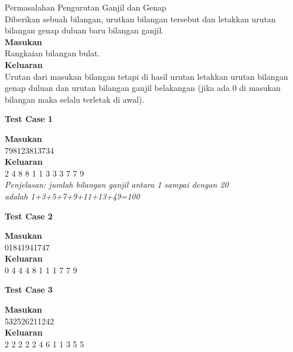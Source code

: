 \newpage
\begin{permasalahan}{Permasalahan Pengurutan Ganjil dan Genap}\\
	Diberikan sebuah bilangan, urutkan bilangan tersebut dan letakkan urutan bilangan genap duluan baru bilangan ganjil.\\
	\textbf{Masukan}\\
	Rangkaian bilangan bulat.\\
	\textbf{Keluaran}\\
	Urutan dari masukan bilangan tetapi di hasil urutan letakkan urutan bilangan genap duluan dan urutan bilangan ganjil belakangan (jika ada 0 di masukan bilangan maka selalu terletak di awal).\\
	\begin{center}
	\textbf{Test Case 1}\\
	\end{center}
	\textbf{Masukan}\\
	798123813734\\
	\textbf{Keluaran}\\
	2 4 8 8 1 1 3 3 3 7 7 9\\
	\textit{Penjelasan: jumlah bilangan ganjil antara 1 sampai dengan 20 \\adalah 1+3+5+7+9+11+13+49=100}\\
	\begin{center}
	\textbf{Test Case 2}\\
	\end{center}
	\textbf{Masukan}\\
	01841941747\\
	\textbf{Keluaran}\\
	0 4 4 4 8 1 1 1 7 7 9\\
	\begin{center}
	\textbf{Test Case 3}\\
	\end{center}
	\textbf{Masukan}\\
	532526211242\\
	\textbf{Keluaran}\\
	2 2 2 2 2 4 6 1 1 3 5 5\\
\end{permasalahan}



